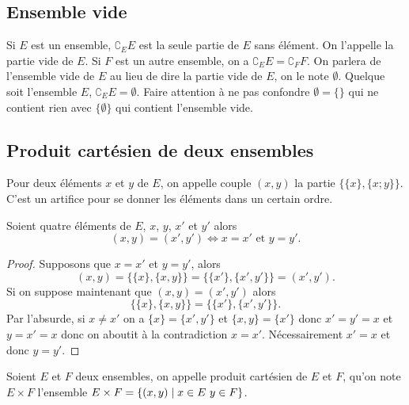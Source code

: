 \subsection{Ensemble vide}\label{chap3-subsec:ensemblevide}

Si \(E\) est un ensemble, \(\complement_E E\) est la seule partie de \(E\) sans
élément. On l'appelle la partie vide de \(E\). Si \(F\) est un autre ensemble,
on a \(\complement_E E = \complement_F F\). On parlera de l'ensemble vide de
\(E\) au lieu de dire la partie vide de \(E\), on le note \(\emptyset\). Quelque
soit l'ensemble \(E\), \(\complement_E E  = \emptyset\).
Faire attention à ne pas confondre \(\emptyset = \{\}\) qui ne contient rien
avec \(\{\emptyset\}\) qui contient l'ensemble vide.

\subsection{Produit cartésien de deux ensembles}\label{chap3-subsec:prodcart}

\begin{defdef}
  Pour deux éléments \(x\) et \(y\) de \(E\), on appelle couple \((x,y)\) la
  partie \(\{\{x\},\{x;y\}\}\). C'est un artifice pour se donner les éléments dans
  un certain ordre.
\end{defdef}

\begin{prop}
  Soient quatre éléments de \(E\), \(x\), \(y\), \(x'\) et \(y'\) alors
  \begin{equation}
    (x,y) = (x',y') \iff{} x = x' \text{~et~} y = y'.
  \end{equation}
\end{prop}
\begin{proof}
  Supposons que \(x = x'\) et \(y = y'\), alors
  \begin{equation*}
    (x,y) = \{\{x\},\{x,y\}\} = \{\{x'\},\{x',y'\}\} = (x',y').
  \end{equation*}
  Si on suppose maintenant que \((x,y) = (x',y')\) alors
  \begin{equation*}
    \{\{x\},\{x,y\}\} = \{\{x'\},\{x',y'\}\}.
  \end{equation*}
  Par l'absurde, si \(x \neq{}x'\) on a \(\{x\} = \{x',y'\}\) et \(\{x,y\} = \{x'\}\)
  donc \(x'=y' = x\) et \(y = x' = x\) donc on aboutit à la contradiction \(x = x'\).
  Nécessairement \(x' = x\) et donc \(y = y'\).
\end{proof}

\begin{defdef}
  Soient \(E\) et \(F\) deux ensembles, on appelle produit cartésien de \(E\) et
  \(F\), qu'on note \(E \times F\) l'ensemble $E \times F = \left\{(x,y)\mathrel{}\middle|\mathrel{}x \in{}E
  \ y \in{}F\right\}$.
\end{defdef}

